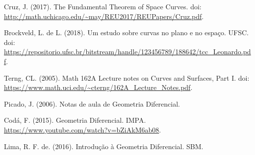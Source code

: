 \documentclass[11pt,letterpaper,twocolumn]{article}
\begin{document}
\begin{thebibliography}{9}

 Cruz, J. (2017). The Fundamental Theorem of Space Curves. doi: \url{http://math.uchicago.edu/~may/REU2017/REUPapers/Cruz.pdf}.

 Brockveld, L. de L. (2018). Um estudo sobre curvas no plano e no espaço. UFSC. doi: \url{https://repositorio.ufsc.br/bitstream/handle/123456789/188642/tcc_Leonardo.pdf}.

 Terng, CL. (2005). Math 162A Lecture notes on Curves and Surfaces, Part I. doi: \url{https://www.math.uci.edu/~cterng/162A_Lecture_Notes.pdf}.

 Picado, J. (2006). Notas de aula de Geometria Diferencial.

 Codá, F. (2015). Geometria Diferencial. IMPA. \url{https://www.youtube.com/watch?v=bZiAkM6ab08}.

 Lima, R. F. de. (2016). Introdução à Geometria Diferencial. SBM.

\end{thebibliography}
\end{document}
